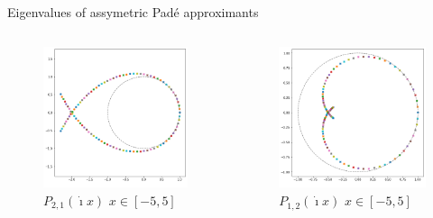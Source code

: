 \documentclass{beamer}
\newcommand{\I}{\dot{\imath}}
\begin{document}
\begin{frame}{Eigenvalues of assymetric Padé approximants}
  \begin{columns}
    \begin{column}{0.5\textwidth}
      \begin{figure}\centering \includegraphics[width=\textwidth]{img/P21_ev} \caption{$P_{2,1}(\I x)$ $x\in[-5,5]$}\end{figure}
    \end{column}
    \begin{column}{0.5\textwidth}
      \begin{figure}\centering \includegraphics[width=\textwidth]{img/P12_ev} \caption{$P_{1,2}(\I x)$ $x\in[-5,5]$}\end{figure}
    \end{column}
  \end{columns}
\end{frame}
\end{document}
